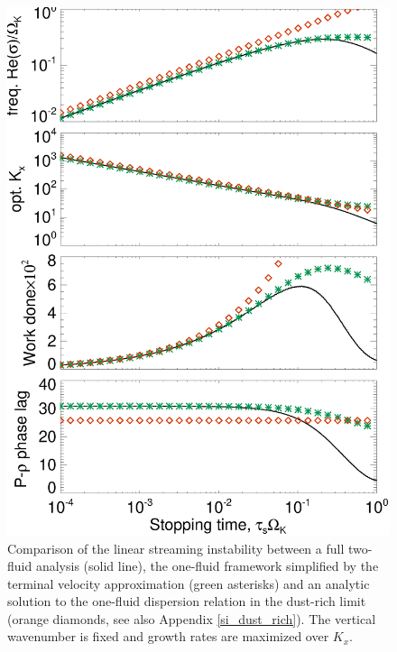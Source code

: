 \begin{figure}
\includegraphics[width=\linewidth]{figures/si_2f_1f_compare}
\caption{Comparison of the linear
streaming instability between a full two-fluid analysis (solid
line), the one-fluid framework simplified by the terminal
velocity approximation (green asterisks) and an analytic solution to
the one-fluid dispersion relation in the dust-rich limit (orange
diamonds, see also Appendix \ref{si_dust_rich}). The vertical 
wavenumber is fixed and growth rates are maximized over $K_x$. 
\label{si_compare_fig}}
\end{figure}












